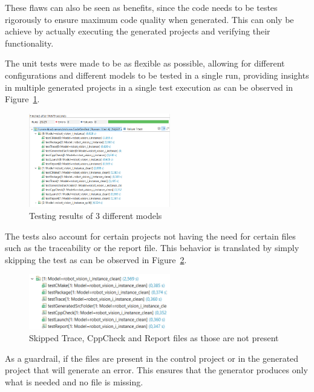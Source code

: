 These flaws can also be seen as benefits, since the code needs to be testes rigorously to ensure maximum code quality when generated. This can only be achieve by actually executing the generated projects and verifying their functionality.

The unit tests were made to be as flexible as possible, allowing for different configurations and different models to be tested in a single run, providing insights in multiple generated projects in a single test execution as can be observed in Figure~\ref{fig:testingResults1}.

\begin{figure}[htbp]
	\centering
	\includegraphics[width=0.55\textwidth]{testingResults1.png}
	\caption{Testing results of 3 different models}
	\label{fig:testingResults1}
\end{figure}

The tests also account for certain projects not having the need for certain files such as the traceability or the report file. This behavior is translated by simply skipping the test as can be observed in Figure~\ref{fig:testingResultsSkip1}.

\begin{figure}[htbp]
	\centering
	\includegraphics[width=0.55\textwidth]{testingResultsSkip1.png}
	\caption{Skipped Trace, CppCheck and Report files as those are not present}
	\label{fig:testingResultsSkip1}
\end{figure}

As a guardrail, if the files are present in the control project or in the generated project that will generate an error. This ensures that the generator produces only what is needed and no file is missing.

